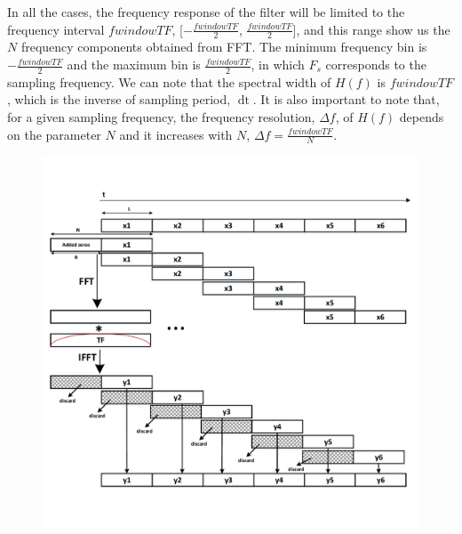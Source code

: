 \documentclass[a4paper]{article}
\begin{document}
In all the cases, the frequency response of the filter will be limited to the frequency interval $fwindowTF$, [$-\frac{fwindowTF}{2}$, $\frac{fwindowTF}{2}$], and this range show us the $N$ frequency components obtained from FFT. The minimum frequency bin is $-\frac{fwindowTF}{2}$ and the maximum bin is $\frac{fwindowTF}{2}$, in which $F_s$ corresponds to the sampling frequency. We can note that the spectral width of $H(f)$ is $fwindowTF$, which is the inverse of sampling period, $\mathop{dt}$. It is also important to note that, for a given sampling frequency, the frequency resolution, $\Delta f$, of $H(f)$ depends on the parameter $N$ and it increases with $N$, $\Delta f=\frac{fwindowTF}{N}$.
\begin{figure}[h]
    \centering
    \includegraphics[width=15cm]{overlap-savev2}
\end{figure}
\end{document}
